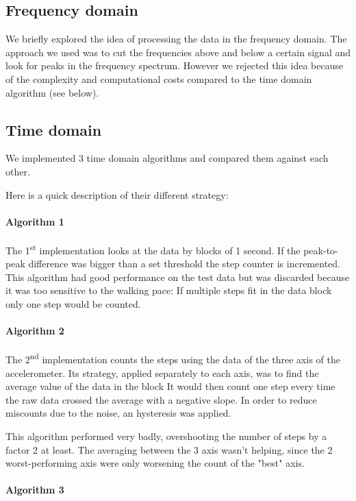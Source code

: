 \documentclass[12pt,twoside,a4paper]{article}
\newcommand{\ts}{\textsuperscript}
\begin{document}
\subsection{Frequency domain}
We briefly explored the idea of processing the data in the frequency domain.
The approach we used was to cut the frequencies above and below a certain signal and look for peaks in the frequency spectrum.
However we rejected this idea because of the complexity and computational costs compared to the time domain algorithm (see below).

\subsection{Time domain}
We implemented 3 time domain algorithms and compared them against each other.

Here is a quick description of their different strategy:
\paragraph{Algorithm 1}
The 1\ts{st} implementation looks at the data by blocks of 1 second.
If the peak-to-peak difference was bigger than a set threshold the step counter is incremented.
This algorithm had good performance on the test data but was discarded because it was too sensitive to the walking pace:
If multiple steps fit in the data block only one step would be counted.

\paragraph{Algorithm 2}
The 2\ts{nd} implementation counts the steps using the data of the three axis of the accelerometer.
Its strategy, applied separately to each axis, was to find the average value of the data in the block
It would then count one step every time the raw data crossed the average with a negative slope.
In order to reduce miscounts due to the noise, an hysteresis was applied.

This algorithm performed very badly, overshooting the number of steps by a factor 2 at least.
The averaging between the 3 axis wasn't helping, since the 2 worst-performing axis were only worsening the count of the "best" axis.

\paragraph{Algorithm 3}
\end{document}

